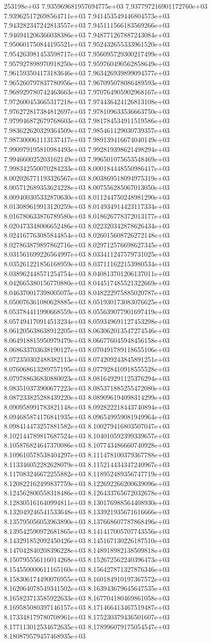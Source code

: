 253198e+03	7.935969681957694775e+03	7.937797216901172760e+03	7.939625172698564711e+03	7.941453549446804573e+03	7.943282347242813557e+03	7.945111566183569266e+03	7.946941206366038386e+03	7.948771267887243084e+03	7.950601750844195521e+03	7.952432655333961520e+03	7.954263981453598717e+03	7.956095729300217499e+03	7.957927898970918250e+03	7.959760490562858649e+03	7.961593504173183646e+03	7.963426939899094577e+03	7.965260797837780956e+03	7.967095078086489593e+03	7.968929780742463663e+03	7.970764905902968167e+03	7.972600453665317218e+03	7.974436424126813108e+03	7.976272817384812697e+03	7.978109633536663750e+03	7.979946872679768603e+03	7.981784534911519586e+03	7.983622620329364509e+03	7.985461129030739357e+03	7.987300061113137417e+03	7.989139416674040149e+03	7.990979195810984493e+03	7.992819398621498294e+03	7.994660025203162149e+03	7.996501075653548469e+03	7.998342550070284233e+03	8.000184448550986417e+03	8.002026771193326567e+03	8.003869518094975319e+03	8.005712689353624228e+03	8.007556285067013050e+03	8.009400305332870630e+03	8.011244750248981290e+03	8.013089619913120259e+03	8.014934914423117334e+03	8.016780633876789580e+03	8.018626778372013177e+03	8.020473348006652486e+03	8.022320342878626434e+03	8.024167763085844854e+03	8.026015608726272148e+03	8.027863879897862716e+03	8.029712576698627345e+03	8.031561699226564997e+03	8.033411247579731025e+03	8.035261221856168959e+03	8.037111622153980534e+03	8.038962448571254754e+03	8.040813701206137011e+03	8.042665380156770880e+03	8.044517485521322669e+03	8.046370017398005075e+03	8.048222975885020787e+03	8.050076361080628885e+03	8.051930173083076625e+03	8.053784411990668559e+03	8.055639077901697419e+03	8.057494170914513234e+03	8.059349691127453298e+03	8.061205638638912205e+03	8.063062013547274546e+03	8.064918815950979479e+03	8.066776045948456158e+03	8.068633703638190127e+03	8.070491789118655106e+03	8.072350302488382113e+03	8.074209243845891251e+03	8.076068613289757195e+03	8.077928410918555528e+03	8.079788636830880023e+03	8.081649291125376294e+03	8.083510373900677223e+03	8.085371885255472080e+03	8.087233825288439220e+03	8.089096194098314299e+03	8.090958991783821148e+03	8.092822218443740894e+03	8.094685874176841935e+03	8.096549959081949964e+03	8.098414473257881582e+03	8.100279416803507047e+03	8.102144789817687524e+03	8.104010592399339657e+03	8.105876824647370086e+03	8.107743486660740928e+03	8.109610578538404297e+03	8.111478100379367788e+03	8.113346052282628079e+03	8.115214434347240967e+03	8.117083246672255882e+03	8.118952489356747719e+03	8.120822162499837759e+03	8.122692266200639096e+03	8.124562800558318486e+03	8.126433765672032678e+03	8.128305161640994811e+03	8.130176988564408930e+03	8.132049246541533648e+03	8.133921935671616666e+03	8.135795056053963890e+03	8.137668607787868496e+03	8.139542590972681865e+03	8.141417005707743556e+03	8.143291852092450426e+03	8.145167130226187510e+03	8.147042840208396228e+03	8.148918982138509818e+03	8.150795556116014268e+03	8.152672562240396473e+03	8.154550000611165160e+03	8.156427871327876346e+03	8.158306174490076955e+03	8.160184910197367572e+03	8.162064078549341502e+03	8.163943679645647535e+03	8.165823713585922633e+03	8.167704180469861058e+03	8.169585080397146157e+03	8.171466413467519487e+03	8.173348179780708961e+03	8.175230379436501607e+03	8.177113012534672635e+03	8.178996079175054547e+03	8.180879579457468935e+03	